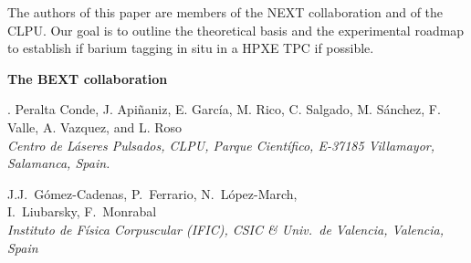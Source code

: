 \begin{titlepage}
\begin{center}
\begin{minipage}{15cm}
The authors of this paper are members of the NEXT collaboration and of the CLPU. Our goal is to outline the theoretical basis and the experimental roadmap to establish if barium tagging in situ in a HPXE TPC if possible.  

\end{minipage}
\end{center}

\begin{center}
\pagebreak 

{\LARGE \bf The BEXT collaboration}

\vspace{0.4cm}

{\small \sc . Peralta Conde, J. Api\~naniz, E. Garc\'ia,  M. Rico, C. Salgado, M. S\'anchez, F. Valle, A. Vazquez, and L. Roso}\\
{\it Centro de L\'aseres Pulsados, CLPU, Parque Cient\'ifico, E-37185 Villamayor, Salamanca, Spain.}

\vspace{0.3cm}

{\small \sc  J.J.~G\'omez-Cadenas, P.~Ferrario, N.~L\'opez-March,  \\I.~Liubarsky, F.~Monrabal}\\
{\it Instituto de F\'isica Corpuscular (IFIC), CSIC \& Univ.\ de Valencia, Valencia, Spain}

\end{center}




\end{titlepage}
